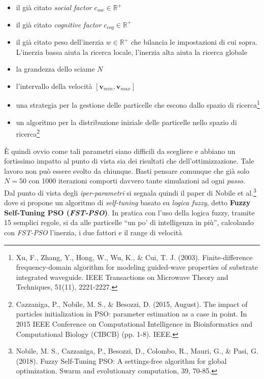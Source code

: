 \documentclass[a4paper,12pt, oneside]{book}
\begin{document}
\begin{itemize}
  \item il già citato \textit{social factor} $c_{soc}\in\mathbb{R}^{+}$
  \item il già citato \textit{cognitive factor} $c_{cog}\in\mathbb{R}^{+}$
  \item il già citato peso dell'inerzia $w\in\mathbb{R}^{+}$ che bilancia le
  impostazioni di cui sopra. L'inerzia bassa aiuta la ricerca locale, l'inerzia
  alta aiuta la ricerca globale 
  \item la grandezza dello sciame $N$
  \item l'intervallo della velocità $[\mathbf{v}_{min}, \mathbf{v}_{max}]$
  \item una strategia per la gestione delle particelle che escono dallo spazio
  di ricerca\footnote{Xu, F., Zhang, Y., Hong, W., Wu, K., \& Cui,
    T. J. (2003). Finite-difference frequency-domain algorithm for modeling
    guided-wave properties of substrate integrated waveguide. IEEE Transactions
    on Microwave Theory and Techniques, 51(11), 2221-2227.} 
  \item un algoritmo per la distribuzione iniziale delle particelle nello spazio
  di ricerca\footnote{Cazzaniga, P., Nobile, M. S., \& Besozzi, D. (2015,
    August). The impact of particles initialization in PSO: parameter estimation
    as a case in point. In 2015 IEEE Conference on Computational Intelligence in
    Bioinformatics and Computational Biology (CIBCB) (pp. 1-8). IEEE.} 
\end{itemize}
È quindi ovvio come tali parametri siano difficili da scegliere e abbiano un
fortissimo impatto al punto di vista sia dei risultati che
dell'ottimizzazione. Tale lavoro non può essere svolto da chiunque. Basti
pensare comunque che già solo $N=50$ con 1000 iterazioni comporti davvero tante
simulazioni ad ogni \textit{passo}.\\
Dal punto di vista degli \textit{iper-parametri} si segnala quindi il paper di
Nobile et al.\footnote{Nobile, M. S., Cazzaniga, P., Besozzi, D., Colombo, R.,
  Mauri, G., \& Pasi, G. (2018). Fuzzy Self-Tuning PSO: A settings-free
  algorithm 
  for global optimization. Swarm and evolutionary computation, 39, 70-85.} dove
si propone un algoritmo di \textit{self-tuning} basato su \textit{logica fuzzy},
detto \textbf{Fuzzy Self-Tuning PSO (\textit{FST-PSO})}. In pratica con l'uso
della logica fuzzy, tramite 15 semplici regole, si da alle particelle ``un po'
di intelligenza in più'', 
calcolando con \textit{FST-PSO} l'inerzia, i due fattori e il range di velocità
\end{document}
